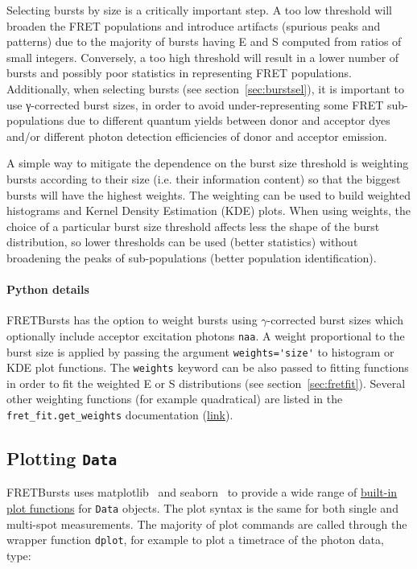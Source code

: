 Selecting bursts by size is a critically important step.
A too low threshold will broaden the FRET populations and introduce
artifacts (spurious peaks and patterns) due to the majority of bursts
having E and S computed from ratios of small integers. 
Conversely, a too high threshold will result in a lower number of bursts 
and possibly poor statistics in representing FRET populations.
Additionally, when selecting bursts (see section~\ref{sec:burstsel}), 
it is important to use γ-corrected burst sizes,
in order to avoid under-representing some FRET sub-populations
due to different quantum yields between donor and acceptor dyes and/or 
different photon detection efficiencies of donor and acceptor emission.

A simple way to mitigate the dependence on the burst size threshold is
weighting bursts according to their size (i.e. their information content)
so that the biggest bursts will have the highest weights.
The weighting can be used to build weighted histograms and Kernel Density 
Estimation (KDE) plots. When using weights, the choice of a particular 
burst size threshold affects less the shape of the burst distribution,
so lower thresholds can be used (better statistics) without broadening 
the peaks of sub-populations (better population identification).

\paragraph{Python details}
FRETBursts has the option to weight bursts using $\gamma$-corrected 
burst sizes which optionally include acceptor excitation photons \verb|naa|.
A weight proportional to the burst size is applied by passing the argument 
\verb|weights='size'| to histogram or KDE plot functions. The \verb|weights|
keyword can be also passed to fitting functions in order to fit 
the weighted E or S distributions (see section~\ref{sec:fretfit}).
Several other weighting functions (for example quadratical) are listed in the
\verb|fret_fit.get_weights| documentation
(\href{http://fretbursts.readthedocs.org/en/latest/fret_fit.html#fretbursts.fret_fit.get_weights}{link}).

\subsection{Plotting \verb|Data|}
\label{sec:plotting}

FRETBursts uses 
matplotlib~\cite{matplotlib}
and seaborn~\cite{seaborn} 
to provide a wide range of
\href{http://fretbursts.readthedocs.org/en/latest/plots.html}{built-in plot functions}
for \verb|Data| objects.
The plot syntax is the same for both single and multi-spot measurements.
The majority of plot commands are called through the wrapper function
\verb|dplot|, for example to plot a timetrace of the photon data, type:

